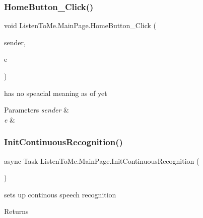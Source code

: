 \subsubsection{\texorpdfstring{Home\+Button\+\_\+\+Click()}{HomeButton\_Click()}}
{\footnotesize\ttfamily void Listen\+To\+Me.\+Main\+Page.\+Home\+Button\+\_\+\+Click (\begin{DoxyParamCaption}\item[{object}]{sender,  }\item[{Routed\+Event\+Args}]{e }\end{DoxyParamCaption})\hspace{0.3cm}{\ttfamily [private]}}



has no speacial meaning as of yet 


\begin{DoxyParams}{Parameters}
{\em sender} & \\
\hline
{\em e} & \\
\hline
\end{DoxyParams}
\mbox{\label{class_listen_to_me_1_1_main_page_adbf1a6a0cab368d6e803bbd1b918a045}} 
\subsubsection{\texorpdfstring{Init\+Continuous\+Recognition()}{InitContinuousRecognition()}}
{\footnotesize\ttfamily async Task Listen\+To\+Me.\+Main\+Page.\+Init\+Continuous\+Recognition (\begin{DoxyParamCaption}{ }\end{DoxyParamCaption})\hspace{0.3cm}{\ttfamily [private]}}



sets up continous speech recognition 

\begin{DoxyReturn}{Returns}

\end{DoxyReturn}
\mbox{\label{class_listen_to_me_1_1_main_page_a45421e24076000d4d47b83b35ee7f45e}} 
